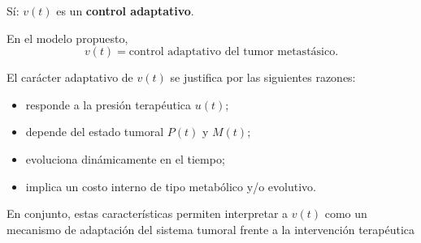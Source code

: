 \documentclass{article}
\begin{document}


Sí: \(v(t)\) es un \textbf{control adaptativo}.

En el modelo propuesto,
\[
v(t) = \text{control adaptativo del tumor metastásico}.
\]

El carácter adaptativo de \(v(t)\) se justifica por las siguientes razones:
\begin{itemize}
    \item responde a la presión terapéutica \(u(t)\);
    \item depende del estado tumoral \(P(t)\) y \(M(t)\);
    \item evoluciona dinámicamente en el tiempo;
    \item implica un costo interno de tipo metabólico y/o evolutivo.
\end{itemize}

En conjunto, estas características permiten interpretar a \(v(t)\) como un mecanismo de adaptación del sistema tumoral frente a la intervención terapéutica
\end{document}
